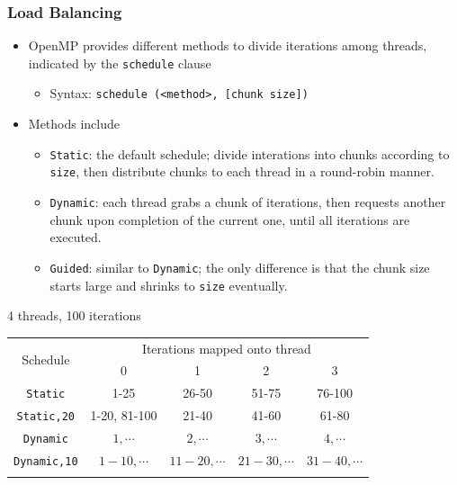 \documentclass[c,mathserif,compress,xcolor=svgnames]{beamer}
\newenvironment{bblock}[0]
{
\begin{beamerboxesrounded}[upper=uppercol1,lower=lowercol1,shadow=true]}
{\end{beamerboxesrounded}}
\begin{document}
\begin{frame}[allowframebreaks]
  \frametitle{\small Load Balancing}
  \begin{itemize}
    \item OpenMP provides different methods to divide iterations among threads, indicated by the \texttt{schedule} clause
    \begin{itemize}
      \item Syntax: \texttt{schedule (<method>, [chunk size])}
    \end{itemize}
    \item Methods include
    \begin{itemize}
      \item \texttt{Static}: the default schedule; divide interations into chunks according to \texttt{size}, then distribute chunks to each thread in a round-robin manner.
      \item \texttt{Dynamic}: each thread grabs a chunk of iterations, then requests another chunk upon completion of the current one, until all iterations are executed.
      \item \texttt{Guided}: similar to \texttt{Dynamic}; the only difference is that the chunk size starts large and shrinks to \texttt{size} eventually.
    \end{itemize}
  \end{itemize}

  \begin{bblock}{4 threads, 100 iterations}
    \begin{tabular}{ccccc}
      \multirow{2}{*}{Schedule}& \multicolumn{4}{c}{Iterations mapped onto thread}\\
      & 0 & 1 & 2 & 3 \\
      \hline
      \texttt{Static} & 1-25 & 26-50 & 51-75 & 76-100 \\
      \texttt{Static,20} & 1-20, 81-100 & 21-40 & 41-60 & 61-80 \\
      \texttt{Dynamic} & $1,\cdots$ & $2,\cdots$ & $3,\cdots$ & $4,\cdots$ \\
      \texttt{Dynamic,10} & $1-10,\cdots$ & $11-20,\cdots$ & $21-30,\cdots$ & $31-40,\cdots$ \\
      \hline\\
    \end{tabular}
  \end{bblock}


\end{frame}
\end{document}
